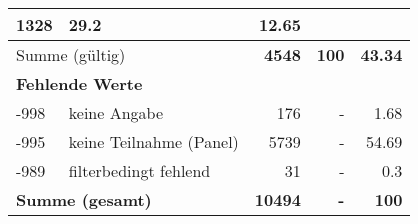 \begin{longtable}{lXrrr}
       \num{1328} &
       \num[round-mode=places,round-precision=2]{29,2} &
         \num[round-mode=places,round-precision=2]{12,65} \\
     \midrule
     \multicolumn{2}{l}{Summe (gültig)} &
       \textbf{\num{4548}} &
     \textbf{100} &
       \textbf{\num[round-mode=places,round-precision=2]{43,34}} \\
     \multicolumn{5}{l}{\textbf{Fehlende Werte}}\\
       -998 &
       keine Angabe &
         \num{176} &
        - &
         \num[round-mode=places,round-precision=2]{1,68} \\
       -995 &
       keine Teilnahme (Panel) &
         \num{5739} &
        - &
         \num[round-mode=places,round-precision=2]{54,69} \\
       -989 &
       filterbedingt fehlend &
         \num{31} &
        - &
         \num[round-mode=places,round-precision=2]{0,3} \\
     \midrule
     \multicolumn{2}{l}{\textbf{Summe (gesamt)}} &
          \textbf{\num{10494}} &
        \textbf{-} &
        \textbf{100} \\
     \bottomrule
     \end{longtable}
     
